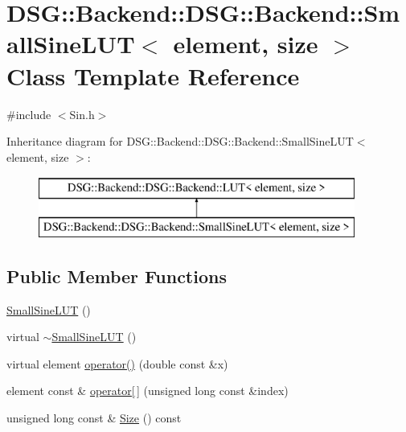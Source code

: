 \hypertarget{classDSG_1_1Backend_1_1DSG_1_1Backend_1_1SmallSineLUT}{\section{D\+S\+G\+:\+:Backend\+:\+:D\+S\+G\+:\+:Backend\+:\+:Small\+Sine\+L\+U\+T$<$ element, size $>$ Class Template Reference}
\label{classDSG_1_1Backend_1_1DSG_1_1Backend_1_1SmallSineLUT}
}


{\ttfamily \#include $<$Sin.\+h$>$}

Inheritance diagram for D\+S\+G\+:\+:Backend\+:\+:D\+S\+G\+:\+:Backend\+:\+:Small\+Sine\+L\+U\+T$<$ element, size $>$\+:\begin{figure}[H]
\begin{center}
\leavevmode
\includegraphics[height=2.000000cm]{classDSG_1_1Backend_1_1DSG_1_1Backend_1_1SmallSineLUT}
\end{center}
\end{figure}
\subsection*{Public Member Functions}
\begin{DoxyCompactItemize}
\item 
\hyperlink{classDSG_1_1Backend_1_1DSG_1_1Backend_1_1SmallSineLUT_a5da2128b03a551413c63f2dfe4c483d2}{Small\+Sine\+L\+U\+T} ()
\item 
virtual \hyperlink{classDSG_1_1Backend_1_1DSG_1_1Backend_1_1SmallSineLUT_aa33f15bd2f4a41916b2a143de41bc12d}{$\sim$\+Small\+Sine\+L\+U\+T} ()
\item 
virtual element \hyperlink{classDSG_1_1Backend_1_1DSG_1_1Backend_1_1SmallSineLUT_a2e15ffae0786ecc7a87d1202c5080850}{operator()} (double const \&x)
\item 
element const \& \hyperlink{classDSG_1_1Backend_1_1DSG_1_1Backend_1_1LUT_acd6db2fa4eba392de1cbb4795f351f8a}{operator\mbox{[}$\,$\mbox{]}} (unsigned long const \&index)
\item 
unsigned long const \& \hyperlink{classDSG_1_1Backend_1_1DSG_1_1Backend_1_1LUT_a65daa6f46f978a64da1c86089847602d}{Size} () const 
\end{DoxyCompactItemize}
